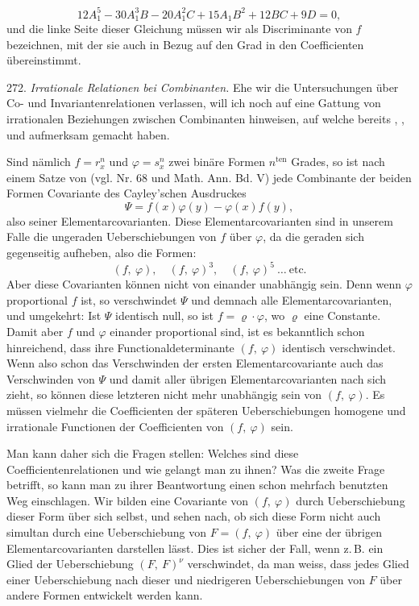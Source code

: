 \documentclass[11pt]{article}
\providecommand{\gesperrt}[1]{\textls[130]{#1}}
\providecommand{\weberpage}[1]{}
\begin{document}
\weberpage{295}

\[
12A_1^5-30A_1^3B-20A_1^2C+15A_1B^2+12BC+9D=0,
\]
und die linke Seite dieser Gleichung müssen wir als Discriminante
von $f$ bezeichnen, mit der sie auch in Bezug auf den Grad in den
Coefficienten übereinstimmt.

272. \textit{Irrationale Relationen bei Combinanten.} Ehe wir die Untersuchungen
 über Co- und Invariantenrelationen verlassen, will ich
noch auf eine Gattung von irrationalen Beziehungen zwischen Combinanten
 hinweisen, auf welche bereits \gesperrt{Brill}, \gesperrt{Stephanos}, \gesperrt{Meyer}
und \gesperrt{Stroh} aufmerksam gemacht haben.

Sind nämlich $f=r_x^n$ und $\varphi=s_x^n$ zwei binäre Formen $n^{\mathrm{ten}}$ Grades,
so ist nach einem Satze von \gesperrt{Gordan} (vgl. Nr. 68 und Math. Ann.
Bd. V) jede Combinante der beiden Formen Covariante des Cayley'schen
Ausdruckes
\[
\varPsi=f(x)\varphi(y)-\varphi(x)f(y),
\]
also seiner Elementarcovarianten. Diese Elementarcovarianten sind
in unserem Falle die ungeraden Ueberschiebungen von $f$ über $\varphi$, da
die geraden sich gegenseitig aufheben, also die Formen:
\[
(f,\ \varphi),\quad (f,\ \varphi)^3,\quad (f,\ \varphi)^5\ \ldots\ \text{etc.}
\]
Aber diese Covarianten können nicht von einander unabhängig sein.
Denn wenn $\varphi$ proportional $f$ ist, so verschwindet $\varPsi$ und demnach alle
Elementarcovarianten, und umgekehrt: Ist $\varPsi$ identisch null, so ist
$f=\varrho\cdot\varphi$, wo $\varrho$ eine Constante. Damit aber $f$ und $\varphi$ einander proportional
 sind, ist es bekanntlich schon hinreichend, dass ihre Functionaldeterminante
 $(f,\ \varphi)$ identisch verschwindet. Wenn also schon das
Verschwinden der ersten Elementarcovariante auch das Verschwinden
von $\varPsi$ und damit aller übrigen Elementarcovarianten nach sich zieht,
so können diese letzteren nicht mehr unabhängig sein von $(f,\ \varphi)$.
Es müssen vielmehr die Coefficienten der späteren Ueberschiebungen
homogene und irrationale Functionen der Coefficienten von $(f,\ \varphi)$ sein.

Man kann daher sich die Fragen stellen: Welches sind diese
Coefficientenrelationen und wie gelangt man zu ihnen? Was die zweite
Frage betrifft, so kann man zu ihrer Beantwortung einen schon mehrfach
 benutzten Weg einschlagen. Wir bilden eine Covariante von
$(f,\ \varphi)$ durch Ueberschiebung dieser Form über sich selbst, und sehen
nach, ob sich diese Form nicht auch simultan durch eine Ueberschiebung
 von $F=(f,\ \varphi)$ über eine der übrigen Elementarcovarianten
darstellen lässt. Dies ist sicher der Fall, wenn z.\,B. ein Glied der
Ueberschiebung $(F,\ F)^\nu$ verschwindet, da man weiss, dass jedes Glied
einer Ueberschiebung nach dieser und niedrigeren Ueberschiebungen
von $F$ über andere Formen entwickelt werden kann.
\end{document}
